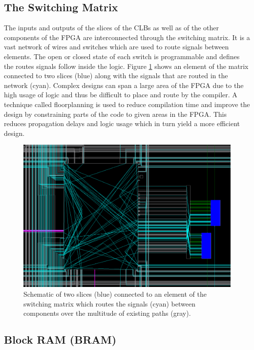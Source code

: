     \subsection{The Switching Matrix}

      The inputs and outputs of the slices of the CLBs as well as of the other components of the FPGA are interconnected through the switching matrix. It is a vast network of wires and switches which are used to route signals between elements. The open or closed state of each switch is programmable and defines the routes signals follow inside the logic. Figure \ref{fig:II-5-switch} shows an element of the matrix connected to two slices (blue) along with the signals that are routed in the network (cyan). Complex designs can span a large area of the FPGA due to the high usage of logic and thus be difficult to place and route by the compiler. A technique called floorplanning is used to reduce compilation time and improve the design by constraining parts of the code to given areas in the FPGA. This reduces propagation delays and logic usage which in turn yield a more efficient design.

      \begin{figure}[b!]
        \centering
        \includegraphics[width=\textwidth]{img/II-5-irradiation/switch.png}
        \caption{Schematic of two slices (blue) connected to an element of the switching matrix which routes the signals (cyan) between components over the multitude of existing paths (gray).}
        \label{fig:II-5-switch}
      \end{figure}

    \subsection{Block RAM (BRAM)}

